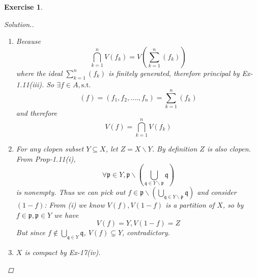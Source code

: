 \documentclass{article}
\theoremstyle{breakstyle}
\newtheorem{exercise}{Exercise}
\newenvironment{solution}
  {\begin{proof}[Solution.]\renewcommand{\qedsymbol}{}}
  {\end{proof}}
\begin{document}
\begin{exercise}
\begin{solution}
\begin{enumerate}[label=({\roman*})]
                For any nonzero, non-unital $f\in A$ consider $1-f$.
                Notice:
                \begin{align*}
                    V(f)\cap V(1-f)
                    &= V((f)+(1-f)) \\
                    &= V(1) \\
                    &= \emptyset
                \end{align*}
                \begin{align*}
                    V(f)\cup V(1-f)&= V((f)(1-f)) \\
                    &= V(0) \\
                    &= X
                \end{align*}
                Therefore $V(f)=X_{1-f}$.
            \item Because
                $$
                \bigcap_{k=1} ^{n}V(f_{k})=V\left( \sum_{k=1}^{n} \left( f_{k} \right)   \right) 
                $$
                where the ideal $\sum_{k=1}^{n} \left( f_{k} \right) $ is finitely generated, therefore principal by \emph{Ex-1.11(iii)}.
                So $\exists f\in A,\text{s.t. }$ 
                $$
                (f)=(f_1,f_2,\ldots .,f_{n})=\sum_{k=1}^{n} \left( f_{k} \right) 
                $$
                and therefore
                $$
                V(f)=\bigcap_{k=1} ^{n}V(f_{k})
                $$
            \item For any clopen subset $Y\subseteq X$, let $Z=X\backslash Y$.
                By definition $Z$ is also clopen.
                From \emph{Prop-1.11(i)}, 
                $$
                \forall \mathfrak{p}\in Y,\mathfrak{p}\backslash \left( \bigcup_{\mathfrak{q} \in Y\backslash \mathfrak{p}} \mathfrak{q} \right) 
                $$
                is nonempty.
                Thus we can pick out $f\in \mathfrak{p}\backslash \left( \bigcup_{\mathfrak{q} \in Y\backslash \mathfrak{p}} \mathfrak{q}\right) $ and consider $(1-f)$:
                From \emph{(i)} we know $V(f),V(1-f)$ is a partition of $X$, so by $f\in \mathfrak{p},\mathfrak{p}\in Y$ we have
                $$
                V(f)=Y,V(1-f)=Z
                $$
                But since $f\not\in \bigcup_{\mathfrak{q} \in Y} \mathfrak{q}$, $V(f)\subsetneq Y$, contradictory.
            \item $X$ is compact by \emph{Ex-17(iv)}.


\end{enumerate}
\end{solution}
\end{exercise}
\end{document}
